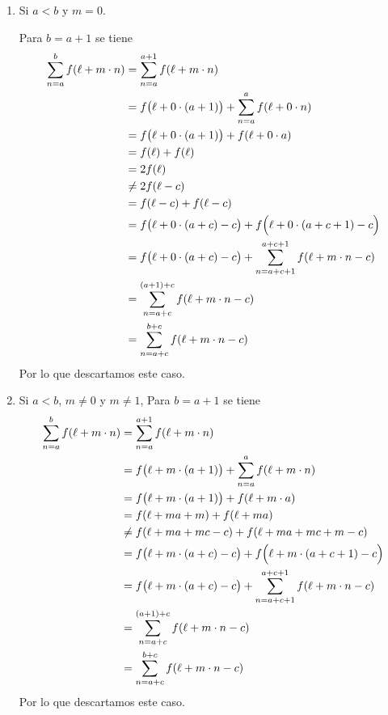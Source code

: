 \begin{enumerate}[label=\alph*)]
\begin{enumerate}[label=\Roman*)]
    \item Si $a<b$ y $m=0$.
    
    Para $b=a+1$ se tiene
    \begin{align*}
      \sum_{n=a}^b f(\ell+m\cdot n) &=\sum_{n=a}^{a+1} f(\ell+m\cdot n)\\
      &= f\bigl(\ell+0\cdot (a+1)\bigr) + \sum_{n=a}^{a} f(\ell+0\cdot n)\\
      &= f\bigl(\ell+0\cdot (a+1)\bigr) + f(\ell+0\cdot a)\\
      &= f(\ell) + f(\ell)\\
      &= 2 f(\ell)\\
      &\neq 2 f(\ell - c) \\
      &= f(\ell-c) + f(\ell-c)\\
      &= f\bigl(\ell+0\cdot (a+c)-c\bigr) + f\Bigl(\ell +0\cdot (a+c+1)-c\Bigr)\\
      &= f\bigl(\ell+0\cdot (a+c)-c\bigr) + \sum_{n=a+c+1}^{a+c+1} f(\ell+m\cdot n-c)\\
      &= \sum_{n=a+c}^{(a+1)+c} f(\ell+m\cdot n-c)\\
      &= \sum_{n=a+c}^{b+c} f(\ell+m\cdot n-c)
    \end{align*}
    Por lo que descartamos este caso.

    \item Si $a<b$, $m\neq 0$ y $m\neq 1$,
    Para $b=a+1$ se tiene
    \begin{align*}
      \sum_{n=a}^b f(\ell+m\cdot n) &=\sum_{n=a}^{a+1} f(\ell+m\cdot n)\\
      &= f\bigl(\ell+m\cdot (a+1)\bigr) + \sum_{n=a}^{a} f(\ell+m\cdot n)\\
      &= f\bigl(\ell+m\cdot (a+1)\bigr) + f(\ell+m\cdot a)\\
      &= f(\ell+ma+m) + f(\ell+ma)\\
      &\neq f(\ell+ma+mc-c) + f(\ell+ma+mc+m-c)\\
      &= f\bigl(\ell+m\cdot (a+c)-c\bigr) + f\Bigl(\ell +m\cdot (a+c+1)-c\Bigr)\\
      &= f\bigl(\ell+m\cdot (a+c)-c\bigr) + \sum_{n=a+c+1}^{a+c+1} f(\ell+m\cdot n-c)\\
      &= \sum_{n=a+c}^{(a+1)+c} f(\ell+m\cdot n-c)\\
      &= \sum_{n=a+c}^{b+c} f(\ell+m\cdot n-c)
    \end{align*}
    Por lo que descartamos este caso.


\end{enumerate}
\end{enumerate}
